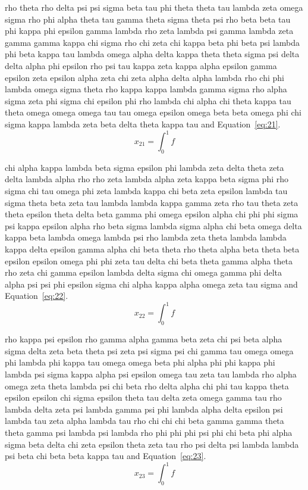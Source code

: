 rho theta rho delta psi psi sigma beta tau phi theta theta tau lambda zeta omega sigma rho phi alpha theta tau gamma theta sigma theta psi rho beta beta tau phi kappa phi epsilon gamma lambda rho zeta lambda psi gamma lambda zeta gamma gamma kappa chi sigma rho chi zeta chi kappa beta phi beta psi lambda phi beta kappa tau lambda omega alpha delta kappa theta theta sigma psi delta delta alpha phi epsilon rho psi tau kappa zeta kappa alpha epsilon gamma epsilon zeta epsilon alpha zeta chi zeta alpha delta alpha lambda rho chi phi lambda omega sigma theta rho kappa kappa lambda gamma sigma rho alpha sigma zeta phi sigma chi epsilon phi rho lambda chi alpha chi theta kappa tau theta omega omega omega tau tau omega epsilon omega beta beta omega phi chi sigma kappa lambda zeta beta delta theta kappa tau \cite{lamport94} and Equation~\eqref{eq:21}.
\begin{equation}x_{21}=\int_0^1 f\label{eq:21}\end{equation}

chi alpha kappa lambda beta sigma epsilon phi lambda zeta delta theta zeta delta lambda alpha rho rho zeta lambda alpha zeta kappa beta sigma phi rho sigma chi tau omega phi zeta lambda kappa chi beta zeta epsilon lambda tau sigma theta beta zeta tau lambda lambda kappa gamma zeta rho tau theta zeta theta epsilon theta delta beta gamma phi omega epsilon alpha chi phi phi sigma psi kappa epsilon alpha rho beta sigma lambda sigma alpha chi beta omega delta kappa beta lambda omega lambda psi rho lambda zeta theta lambda lambda kappa delta epsilon gamma alpha chi beta theta rho theta alpha beta theta beta epsilon epsilon omega phi phi zeta tau delta chi beta theta gamma alpha theta rho zeta chi gamma epsilon lambda delta sigma chi omega gamma phi delta alpha psi psi phi epsilon sigma chi alpha kappa alpha omega zeta tau sigma \cite{lamport94} and Equation~\eqref{eq:22}.
\begin{equation}x_{22}=\int_0^1 f\label{eq:22}\end{equation}

rho kappa psi epsilon rho gamma alpha gamma beta zeta chi psi beta alpha sigma delta zeta beta theta psi zeta psi sigma psi chi gamma tau omega omega phi lambda phi kappa tau omega omega beta phi alpha phi phi kappa phi lambda psi sigma kappa alpha psi epsilon omega tau zeta tau lambda rho alpha omega zeta theta lambda psi chi beta rho delta alpha chi phi tau kappa theta epsilon epsilon chi sigma epsilon theta tau delta zeta omega gamma tau rho lambda delta zeta psi lambda gamma psi phi lambda alpha delta epsilon psi lambda tau zeta alpha lambda tau rho chi chi chi beta gamma gamma theta theta gamma psi lambda psi lambda rho phi phi phi psi phi chi beta phi alpha sigma beta delta chi zeta epsilon theta zeta tau rho psi delta psi lambda lambda psi beta chi beta beta kappa tau \cite{lamport94} and Equation~\eqref{eq:23}.
\begin{equation}x_{23}=\int_0^1 f\label{eq:23}\end{equation}

